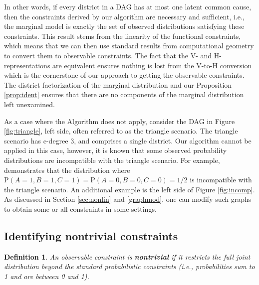 \documentclass[12pt]{article}
\newtheorem{definition}{Definition}
\def\Pr{{\mathrm{P}}}
\begin{document}
In other words, if every district in a DAG has at most one latent common cause, then the constraints derived by our algorithm are necessary and sufficient, i.e., the marginal model is exactly the set of observed distributions satisfying these constraints. This result stems from the linearity of the functional constraints, which means that we can then use standard results from computational geometry to convert them to observable constraints. The fact that the V- and H- representations are equivalent ensures nothing is lost from the V-to-H conversion which is the cornerstone of our approach to getting the observable constraints. The district factorization of the marginal distribution and our Proposition \ref{prop:ident} ensures that there are no components of the marginal distribution left unexamined. 

As a case where the Algorithm does not apply, consider the DAG in Figure \ref{fig:triangle}, left side, often referred to as the triangle scenario. The triangle scenario has c-degree 3, and comprises a single district. Our algorithm cannot be applied in this case, however, it is known that some observed probability distributions are incompatible with the triangle scenario. For example, \citet{Wolfe_2019} demonstrates that the distribution where $\Pr(A = 1, B = 1, C = 1) = \Pr(A = 0, B = 0, C = 0) = 1/2$ is incompatible with the triangle scenario. An additional example is the left side of Figure \ref{fig:incomp}. As discussed in Section \ref{sec:nonlin} and \ref{graphmod}, one can modify such graphs to obtain some or all constraints in some settings. 



\subsection{Identifying nontrivial constraints}


\begin{definition} \label{def:nontrivial}
    An observable constraint is \textbf{nontrivial} if it restricts the full joint distribution beyond the standard probabilistic constraints (i.e., probabilities sum to 1 and are between 0 and 1).  
\end{definition}
\end{document}
